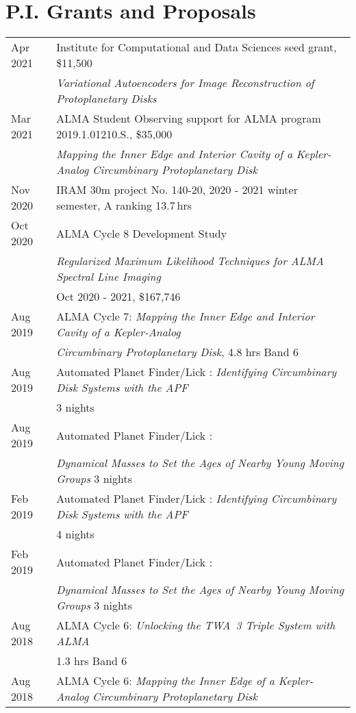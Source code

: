 \section*{P.I. Grants and Proposals}
\begin{tabular*}{\textwidth}{@{\hspace{10pt}}p{1.2in}l}
  Apr 2021 & Institute for Computational and Data Sciences seed grant, \$11,500\\
  & \emph{Variational Autoencoders for Image Reconstruction of Protoplanetary Disks} \\
  Mar 2021 & ALMA Student Observing support for ALMA program 2019.1.01210.S., \$35,000 \\
  & \emph{Mapping the Inner Edge and Interior Cavity of a Kepler-Analog Circumbinary Protoplanetary Disk} \\
  Nov 2020 & IRAM 30m project No. 140-20, 2020 - 2021 winter semester, A ranking 13.7\,hrs \\ 
  Oct 2020 & ALMA Cycle 8 Development Study\\
  & \emph{Regularized Maximum Likelihood Techniques for ALMA Spectral Line Imaging} \\
  & Oct 2020 - 2021, \$167,746 \\
  Aug 2019 & ALMA Cycle 7: \emph{Mapping the Inner Edge and Interior Cavity of a Kepler-Analog}\\
  & \emph{Circumbinary Protoplanetary Disk}, 4.8 hrs Band 6\\
  Aug 2019 & Automated Planet Finder/Lick : \emph{Identifying Circumbinary Disk Systems with the APF} \\
  & 3 nights \\
  Aug 2019 & Automated Planet Finder/Lick : \\
  & \emph{Dynamical Masses to Set the Ages of Nearby Young Moving Groups} 3 nights \\
  Feb 2019 & Automated Planet Finder/Lick : \emph{Identifying Circumbinary Disk Systems with the APF} \\
  & 4 nights \\
  Feb 2019 & Automated Planet Finder/Lick : \\
  & \emph{Dynamical Masses to Set the Ages of Nearby Young Moving Groups} 3 nights \\
  Aug 2018 & ALMA Cycle 6: \emph{Unlocking the TWA~3 Triple System with ALMA}\\
  & 1.3 hrs Band 6\\
  Aug 2018 & ALMA Cycle 6: \emph{Mapping the Inner Edge of a Kepler-Analog Circumbinary Protoplanetary Disk}\\

\end{tabular*}
